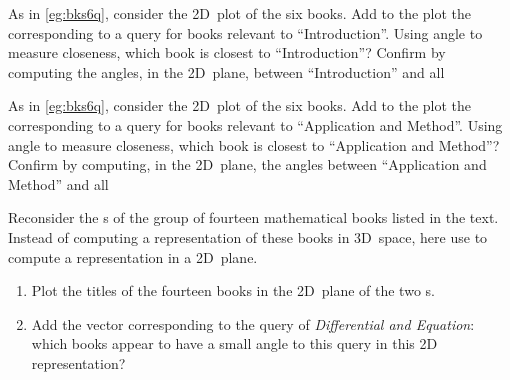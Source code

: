 \begin{reduce}
\begin{exercise}  
As in \cref{eg:bks6q}, consider the 2D~plot of the six books. Add to the plot the  corresponding to a query for books relevant to ``Introduction''.
Using angle to measure closeness, which book is closest to ``Introduction''?  
Confirm by computing the angles, in the 2D~plane, between ``Introduction'' and all 
\end{exercise}



\begin{exercise}  
As in \cref{eg:bks6q}, consider the 2D~plot of the six books. Add to the plot the  corresponding to a query for books relevant to ``Application and Method''.
Using angle to measure closeness, which book is closest to ``Application and Method''?  
Confirm by computing, in the 2D~plane, the angles between ``Application and Method'' and all 
\end{exercise}




\begin{exercise}  
Reconsider the s of the group of fourteen mathematical books listed in the text. 
Instead of computing a representation of these books in 3D~space, here use  to compute a representation in a 2D~plane.
\begin{enumerate}
\item Plot the titles of the fourteen books in the 2D~plane of the two s.

\item Add the vector corresponding to the query of \emph{Differential and Equation}: which books appear to have a small angle to this query in this 2D representation?



\end{enumerate}
\end{exercise}
\end{reduce}
